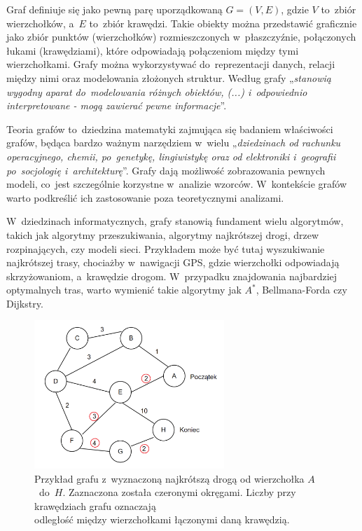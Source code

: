 Graf definiuje się jako pewną parę uporządkowaną $G = (V, E)$, gdzie $V$ to~zbiór wierzchołków,
a~$E$ to~zbiór krawędzi.
Takie obiekty można przedstawić graficznie jako zbiór punktów (wierzchołków) rozmieszczonych w~płaszczyźnie,
połączonych łukami (krawędziami), które odpowiadają połączeniom między tymi wierzchołkami.
Grafy można wykorzystywać do~reprezentacji danych, relacji między nimi oraz modelowania złożonych struktur.
Według \cite{Wloch2008} grafy „\textit{stanowią wygodny aparat do~modelowania różnych obiektów, (...) i~odpowiednio interpretowane
- mogą zawierać pewne informacje}”.

Teoria grafów to~dziedzina matematyki zajmująca się badaniem właściwości grafów,
będąca bardzo ważnym narzędziem w~wielu „\textit{dziedzinach od rachunku operacyjnego, chemii, po~genetykę, lingiwistykę
oraz od elektroniki i~geografii po~socjologię i~architekturę}”\cite{Wilson2012}.
Grafy dają możliwość zobrazowania pewnych modeli, co~jest szczególnie korzystne w~analizie wzorców.
W~kontekście grafów warto podkreślić ich zastosowanie poza teoretycznymi analizami.

W~dziedzinach informatycznych, grafy stanowią fundament wielu algorytmów, takich jak algorytmy przeszukiwania,
algorytmy najkrótszej drogi, drzew rozpinających, czy modeli sieci.
Przykładem może być tutaj wyszukiwanie najkrótszej trasy, chociażby w~nawigacji GPS,
gdzie wierzchołki odpowiadają skrzyżowaniom, a~krawędzie drogom.
W~przypadku znajdowania najbardziej optymalnych tras, warto wymienić takie algorytmy jak $A^*$, Bellmana-Forda czy Dijkstry.

\begin{figure}[ht]
	\centering
	\includegraphics[height=5.6cm]{resources/introduction/images/shortest_path.png}
	\caption{Przykład grafu z~wyznaczoną najkrótszą drogą od wierzchołka $A$~do~$H$.
		Zaznaczona została czeronymi okręgami.
		Liczby przy krawędziach grafu oznaczają \\ odległość między wierzchołkami łączonymi daną krawędzią.}
    \label{Fig:intro-1}
\end{figure}
\FloatBarrier

